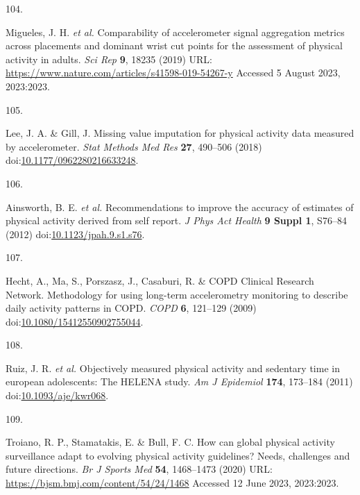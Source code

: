 \documentclass[
  10pt,
]{scrbook}
\newlength{\cslhangindent}
\newlength{\csllabelwidth}
\newlength{\cslentryspacingunit} %
\newenvironment{CSLReferences}[2] %
 {%
  \setlength{\parindent}{0pt}
  \ifodd #1
  \let\oldpar\par
  \def\par{\hangindent=\cslhangindent\oldpar}
  \fi
  \setlength{\parskip}{#2\cslentryspacingunit}
 }%
 {}
\newcommand{\CSLLeftMargin}[1]{\parbox[t]{\csllabelwidth}{#1}}
\newcommand{\CSLRightInline}[1]{\parbox[t]{\linewidth - \csllabelwidth}{#1}\break}
\let\originaltextbf\textbf
\renewcommand{\textbf}[1]{\textcolor{color1}{\originaltextbf{#1}}}
\begin{document}
\begin{CSLReferences}{0}{0}
\leavevmode{}%
\CSLLeftMargin{104. }%
\CSLRightInline{Migueles, J. H. \emph{et al.} Comparability of
accelerometer signal aggregation metrics across placements and dominant
wrist cut points for the assessment of physical activity in adults.
\emph{Sci Rep} \textbf{9}, 18235 (2019) URL:
\url{https://www.nature.com/articles/s41598-019-54267-y} Accessed 5
August 2023, 2023:2023.}

\leavevmode{}%
\CSLLeftMargin{105. }%
\CSLRightInline{Lee, J. A. \& Gill, J. Missing value imputation for
physical activity data measured by accelerometer. \emph{Stat Methods Med
Res} \textbf{27}, 490--506 (2018)
doi:\href{https://doi.org/10.1177/0962280216633248}{10.1177/0962280216633248}.}

\leavevmode{}%
\CSLLeftMargin{106. }%
\CSLRightInline{Ainsworth, B. E. \emph{et al.} Recommendations to
improve the accuracy of estimates of physical activity derived from self
report. \emph{J Phys Act Health} \textbf{9 Suppl 1}, S76--84 (2012)
doi:\href{https://doi.org/10.1123/jpah.9.s1.s76}{10.1123/jpah.9.s1.s76}.}

\leavevmode{}%
\CSLLeftMargin{107. }%
\CSLRightInline{Hecht, A., Ma, S., Porszasz, J., Casaburi, R. \& COPD
Clinical Research Network. Methodology for using long-term accelerometry
monitoring to describe daily activity patterns in {COPD}. \emph{{COPD}}
\textbf{6}, 121--129 (2009)
doi:\href{https://doi.org/10.1080/15412550902755044}{10.1080/15412550902755044}.}

\leavevmode{}%
\CSLLeftMargin{108. }%
\CSLRightInline{Ruiz, J. R. \emph{et al.} Objectively measured physical
activity and sedentary time in european adolescents: The {HELENA} study.
\emph{Am J Epidemiol} \textbf{174}, 173--184 (2011)
doi:\href{https://doi.org/10.1093/aje/kwr068}{10.1093/aje/kwr068}.}

\leavevmode{}%
\CSLLeftMargin{109. }%
\CSLRightInline{Troiano, R. P., Stamatakis, E. \& Bull, F. C. How can
global physical activity surveillance adapt to evolving physical
activity guidelines? Needs, challenges and future directions. \emph{Br J
Sports Med} \textbf{54}, 1468--1473 (2020) URL:
\url{https://bjsm.bmj.com/content/54/24/1468} Accessed 12 June 2023,
2023:2023.}


\end{CSLReferences}
\end{document}
